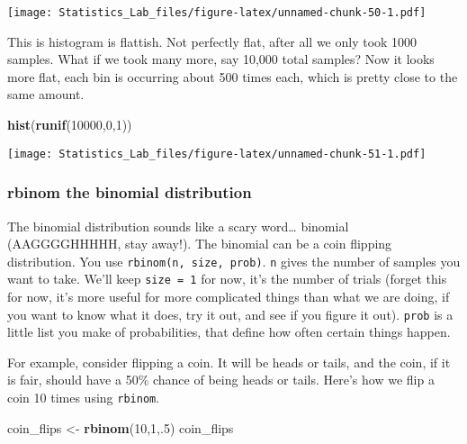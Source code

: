 \documentclass[
]{book}
\newenvironment{Shaded}{\begin{snugshade}}{\end{snugshade}}
\newcommand{\DecValTok}[1]{\textcolor[rgb]{0.00,0.00,0.81}{#1}}
\newcommand{\FunctionTok}[1]{\textcolor[rgb]{0.13,0.29,0.53}{\textbf{#1}}}
\newcommand{\NormalTok}[1]{#1}
\newcommand{\OtherTok}[1]{\textcolor[rgb]{0.56,0.35,0.01}{#1}}
\begin{document}
\texttt{[image: Statistics\_Lab\_files/figure-latex/unnamed-chunk-50-1.pdf]}

This is histogram is flattish. Not perfectly flat, after all we only
took 1000 samples. What if we took many more, say 10,000 total samples?
Now it looks more flat, each bin is occurring about 500 times each,
which is pretty close to the same amount.

\begin{Shaded}
\begin{Highlighting}[]
\FunctionTok{hist}\NormalTok{(}\FunctionTok{runif}\NormalTok{(}\DecValTok{10000}\NormalTok{,}\DecValTok{0}\NormalTok{,}\DecValTok{1}\NormalTok{))}
\end{Highlighting}
\end{Shaded}

\texttt{[image: Statistics\_Lab\_files/figure-latex/unnamed-chunk-51-1.pdf]}

\hypertarget{rbinom-the-binomial-distribution}{%
\subsubsection{rbinom the binomial distribution}\label{rbinom-the-binomial-distribution}}

The binomial distribution sounds like a scary word\ldots{} binomial
(AAGGGGHHHHH, stay away!). The binomial can be a coin flipping
distribution. You use \texttt{rbinom(n,\ size,\ prob)}. \texttt{n} gives the number of
samples you want to take. We'll keep \texttt{size\ =\ 1} for now, it's the number
of trials (forget this for now, it's more useful for more complicated
things than what we are doing, if you want to know what it does, try it
out, and see if you figure it out). \texttt{prob} is a little list you make of
probabilities, that define how often certain things happen.

For example, consider flipping a coin. It will be heads or tails, and
the coin, if it is fair, should have a 50\% chance of being heads or
tails. Here's how we flip a coin 10 times using \texttt{rbinom}.

\begin{Shaded}
\begin{Highlighting}[]
\NormalTok{coin\_flips }\OtherTok{\textless{}{-}} \FunctionTok{rbinom}\NormalTok{(}\DecValTok{10}\NormalTok{,}\DecValTok{1}\NormalTok{,.}\DecValTok{5}\NormalTok{)}
\NormalTok{coin\_flips}
\end{Highlighting}
\end{Shaded}
\end{document}
